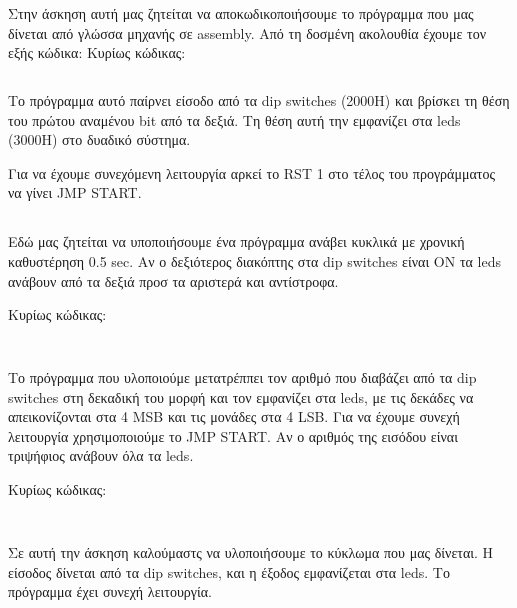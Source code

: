 \documentclass[a4paper,10pt]{article}
\begin{document}
\def\thesubsection {Άσκηση (\roman{subsection})}



\section*{} 
\subsection{}

Στην άσκηση αυτή μας ζητείται να αποκωδικοποιήσουμε το πρόγραμμα που μας
δίνεται από γλώσσα μηχανής σε assembly. Από τη δοσμένη ακολουθία έχουμε τον
εξής κώδικα:
\noindent Κυρίως κώδικας:
\inputminted[linenos,obeytabs,fontsize=\footnotesize]{nasm}{files/1-1.8085}

Το πρόγραμμα αυτό παίρνει είσοδο από τα dip switches (2000H) και βρίσκει τη
θέση του πρώτου αναμένου bit από τα δεξιά. Τη θέση αυτή την εμφανίζει στα leds
(3000H) στο δυαδικό σύστημα. 

Για να έχουμε συνεχόμενη λειτουργία αρκεί το RST 1 στο τέλος του προγράμματος
να γίνει JMP START.

\subsection{}

Εδώ μας ζητείται να υποποιήσουμε ένα πρόγραμμα ανάβει κυκλικά με χρονική
καθυστέρηση 0.5 sec. Αν ο δεξιότερος διακόπτης στα dip switches είναι ON τα 
leds ανάβουν από τα δεξιά προσ τα αριστερά και αντίστροφα. 

\noindent Κυρίως κώδικας:
\inputminted[linenos,obeytabs,fontsize=\footnotesize]{nasm}{files/1-2.8085}

\subsection{}

Το πρόγραμμα που υλοποιούμε μετατρέππει τον αριθμό που διαβάζει από τα dip
switches στη δεκαδική του μορφή και τον εμφανίζει στα leds, με τις δεκάδες να
απεικονίζονται στα 4 MSB και τις μονάδες στα 4 LSB.  Για να έχουμε συνεχή
λειτουργία χρησιμοποιούμε το JMP START. Αν ο αριθμός της εισόδου είναι
τριψήφιος ανάβουν όλα τα leds.

\noindent Κυρίως κώδικας:
\inputminted[linenos,obeytabs,fontsize=\footnotesize]{nasm}{files/1-3.8085}

\subsection{}
Σε αυτή την άσκηση καλούμαστς να υλοποιήσουμε το κύκλωμα που μας δίνεται. Η
είσοδος δίνεται από τα dip switches, και η έξοδος εμφανίζεται στα leds. Το
πρόγραμμα έχει συνεχή λειτουργία.
\end{document}
